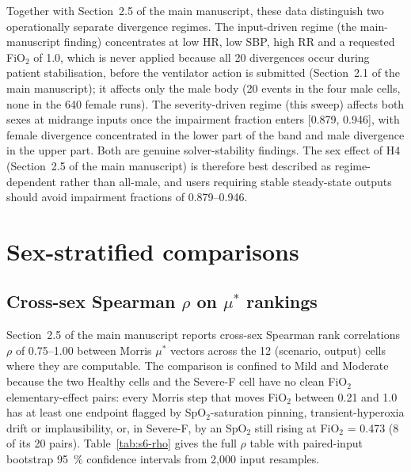 \documentclass[pdflatex,sn-nature]{sn-jnl}%
\newcommand{\mainref}[2]{#2}
\begin{document}
Together with Section~\mainref{sec:results-sex}{2.5} of the main manuscript, these data distinguish two operationally separate divergence regimes. The input-driven regime (the main-manuscript finding) concentrates at low HR, low SBP, high RR and a requested FiO$_2$ of 1.0, which is never applied because all 20 divergences occur during patient stabilisation, before the ventilator action is submitted (Section~\mainref{sec:results-overview}{2.1} of the main manuscript); it affects only the male body (20 events in the four male cells, none in the 640 female runs). The severity-driven regime (this sweep) affects both sexes at midrange inputs once the impairment fraction enters [0.879, 0.946], with female divergence concentrated in the lower part of the band and male divergence in the upper part. Both are genuine solver-stability findings. The sex effect of H4 (Section~\mainref{sec:results-sex}{2.5} of the main manuscript) is therefore best described as regime-dependent rather than all-male, and users requiring stable steady-state outputs should avoid impairment fractions of 0.879--0.946.


\section{Sex-stratified comparisons}\label{sec:s6}

\subsection{\texorpdfstring{Cross-sex Spearman $\rho$ on $\mu^{*}$ rankings}{Cross-sex Spearman rho on mu* rankings}}\label{sec:s6-rho}

Section~\mainref{sec:results-sex}{2.5} of the main manuscript reports cross-sex Spearman rank correlations $\rho$ of 0.75--1.00 between Morris $\mu^{*}$ vectors across the 12 (scenario, output) cells where they are computable. The comparison is confined to Mild and Moderate because the two Healthy cells and the Severe-F cell have no clean FiO$_2$ elementary-effect pairs: every Morris step that moves FiO$_2$ between 0.21 and 1.0 has at least one endpoint flagged by SpO$_2$-saturation pinning, transient-hyperoxia drift or implausibility, or, in Severe-F, by an SpO$_2$ still rising at FiO$_2$ = 0.473 (8 of its 20 pairs). Table~\ref{tab:s6-rho} gives the full $\rho$ table with paired-input bootstrap 95~\% confidence intervals from 2{,}000 input resamples.
\end{document}
